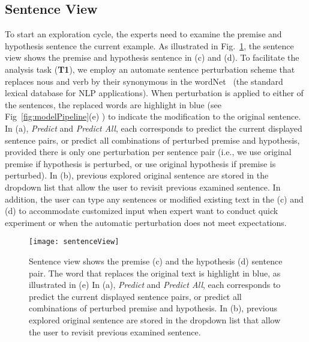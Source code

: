 \subsection{Sentence View}
\label{sec:sentence}
To start an exploration cycle, the experts need to examine the premise and hypothesis sentence the current example.
As illustrated in Fig.~\ref{fig:sentenceView}, the sentence view shows the premise and hypothesis sentence in (c) and (d).
%
To facilitate the analysis task (\textbf{T1}), we employ an automate sentence perturbation scheme that replaces nous and verb by their synonymous in the wordNet~\cite{Miller1995} (the standard lexical database for NLP applications).
%
When perturbation is applied to either of the sentences, the replaced words are highlight in blue (see Fig~\ref{fig:modelPipeline}(e) ) to indicate the modification to the original sentence.
%
In (a), \emph{Predict} and \emph{Predict All}, each corresponds to predict the current displayed sentence pairs, or predict all combinations of perturbed premise and hypothesis, provided there is only one perturbation per sentence pair (i.e., we use original premise if hypothesis is perturbed, or use original hypothesis if premise is perturbed).
In (b), previous explored original sentence are stored in the dropdown list that allow the user to revisit previous examined sentence.
In addition, the user can type any sentences or modified existing text in the (c) and (d) to accommodate customized input when expert want to conduct quick experiment or when the automatic perturbation does not meet expectations.

\begin{figure}[htbp]
\centering
\vspace{-2mm}
 \texttt{[image: sentenceView]}
 \caption{
Sentence view shows the premise (c) and the hypothesis (d) sentence pair. The word that replaces the original text is highlight in blue, as illustrated in (e)
In (a), \emph{Predict} and \emph{Predict All}, each corresponds to predict the current displayed sentence pairs, or predict all combinations of perturbed premise and hypothesis.
In (b), previous explored original sentence are stored in the dropdown list that allow the user to revisit previous examined sentence.
 }
\label{fig:sentenceView}
\end{figure}

